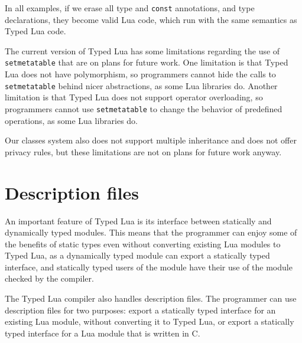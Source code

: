 In all examples, if we erase all type and \texttt{const} annotations,
and type declarations, they become valid Lua code, which run with the
same semantics as Typed Lua code.

The current version of Typed Lua has some limitations regarding
the use of \texttt{setmetatable} that are on plans for future work.
One limitation is that Typed Lua does not have polymorphism,
so programmers cannot hide the calls to \texttt{setmetatable} behind
nicer abstractions, as some Lua libraries do.
Another limitation is that Typed Lua does not support operator overloading,
so programmers cannot use \texttt{setmetatable} to change the behavior
of predefined operations, as some Lua libraries do.

Our classes system also does not support multiple inheritance
and does not offer privacy rules, but these limitations are not
on plans for future work anyway.

\section{Description files}
\label{sec:tld}

An important feature of Typed Lua is its interface between
statically and dynamically typed modules.
This means that the programmer can enjoy some of the benefits of
static types even without converting existing Lua modules to Typed Lua,
as a dynamically typed module can export a statically typed interface,
and statically typed users of the module have their use of the module
checked by the compiler.

The Typed Lua compiler also handles description files.
The programmer can use description files for two purposes:
export a statically typed interface for an existing Lua
module, without converting it to Typed Lua,
or export a statically typed interface for a Lua module
that is written in C.

